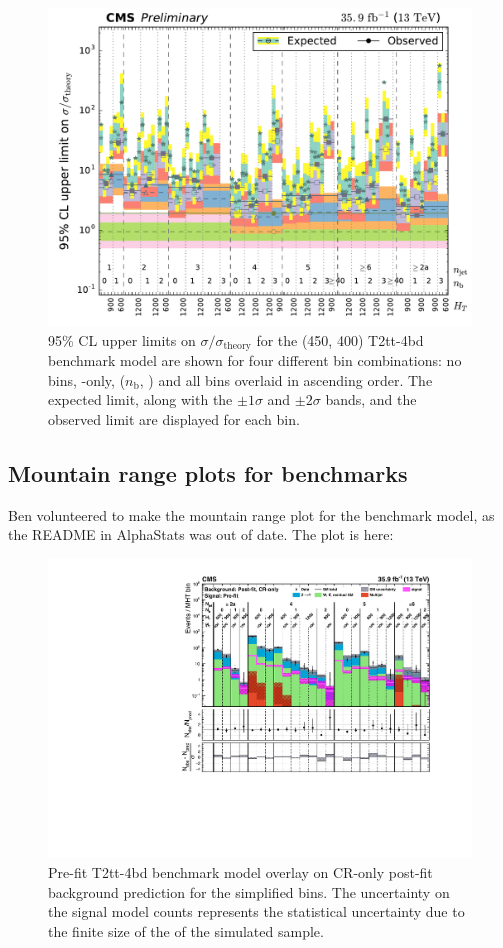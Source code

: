 \begin{figure}[H]
\centering
\includegraphics[width=120mm]{./sec31/SMS-T2tt_mStop-450_mLSP-400_25ns_limits_nj_nb_ht.pdf}
\caption{95\% CL upper limits on $\sigma / \sigma_{\mathrm{theory}}$ for the (450, 400) T2tt-4bd benchmark model are shown for four different bin combinations: no bins, \HT-only, ($n_{\mathrm{b}}$, \HT) and all bins overlaid in ascending order. The expected limit, along with the $\pm 1 \sigma$ and $\pm 2 \sigma$ bands, and the observed limit are displayed for each bin.}
\end{figure}


\subsection{Mountain range plots for benchmarks}

Ben volunteered to make the mountain range plot for the benchmark model, as the README in AlphaStats was out of date. The plot is here:

\begin{figure}[H]
\centering
\includegraphics[width=140mm]{./sec31/all_full-fit-sig-top_bins_25.pdf}
\caption{Pre-fit T2tt-4bd benchmark model overlay on CR-only post-fit background prediction for the simplified bins. The uncertainty on the signal model counts represents the statistical uncertainty due to the finite size of the of the simulated sample.}
\end{figure}


